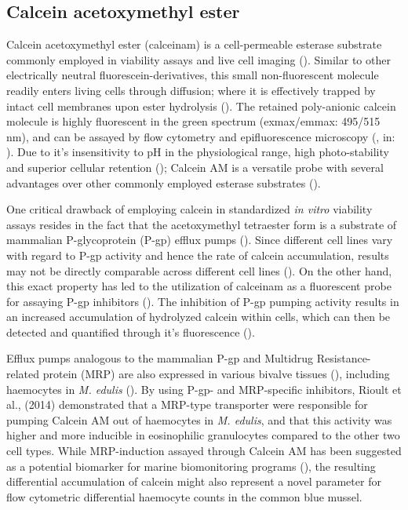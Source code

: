 \subsection{Calcein acetoxymethyl ester}
Calcein acetoxymethyl ester (\acrshort{calceinam}) is a cell-permeable esterase substrate commonly employed in viability assays and live cell imaging (\cite{Ramirez2010}). Similar to other electrically neutral fluorescein-derivatives, this small non-fluorescent molecule readily enters living cells through diffusion; where it is effectively trapped by intact cell membranes upon ester hydrolysis (\cite{Kaneshiro1993}). The retained poly-anionic calcein molecule is highly fluorescent in the green spectrum (\acrshort{exmax}/\acrshort{emmax}: 495/515 nm), and can be assayed by flow cytometry and epifluorescence microscopy (\cite{Wallach1959}, in: \cite{Chiu1977}). Due to it's insensitivity to pH in the physiological range, high photo-stability and superior cellular retention (\cite{Chiu1977, Kaneshiro1993}); Calcein AM is a versatile probe with several advantages over other commonly employed esterase substrates (\cite{Ramirez2010}).

One critical drawback of employing calcein in standardized \emph{in vitro} viability assays resides in the fact that the acetoxymethyl tetraester form is a substrate of mammalian P-glycoprotein (P-gp) efflux pumps (\cite{Liminga1995}). Since different cell lines vary with regard to P-gp activity and hence the rate of calcein accumulation, results may not be directly comparable across different cell lines (\cite{Ramirez2010}). On the other hand, this exact property has led to the utilization of \acrshort{calceinam} as a fluorescent probe for assaying P-gp inhibitors (\cite{Di2016}). The inhibition of P-gp pumping activity results in an increased accumulation of hydrolyzed calcein within cells, which can then be detected and quantified through it's fluorescence (\cite{Tiberghien1996, Köhler2003}).

Efflux pumps analogous to the mammalian P-gp and Multidrug Resistance-related protein (MRP) are also expressed in various bivalve tissues (\cite{Luckenbach2008, Luedeking2005}), including haemocytes in \emph{M. edulis} (\cite{Rioult2014}). By using P-gp- and MRP-specific inhibitors, Rioult et al., (2014) demonstrated that a MRP-type transporter were responsible for pumping Calcein AM out of haemocytes in \emph{M. edulis}, and that this activity was higher and more inducible in eosinophilic granulocytes compared to the other two cell types. While MRP-induction assayed through Calcein AM has been suggested as a potential biomarker for marine biomonitoring programs (\cite{Rioult2014, Minier1998}), the resulting differential accumulation of calcein might also represent a novel parameter for flow cytometric differential haemocyte counts in the common blue mussel.

